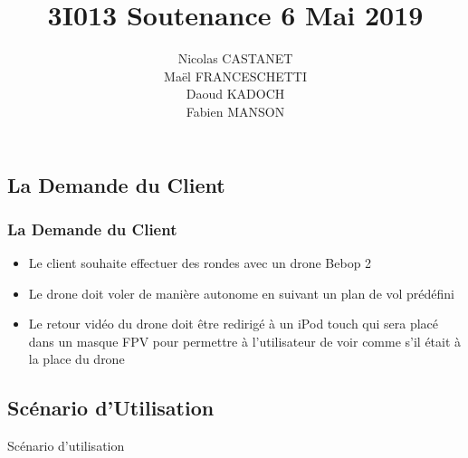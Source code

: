\documentclass{beamer}
\title{3I013 Soutenance 6 Mai 2019}
\author{Nicolas CASTANET\\ Maël FRANCESCHETTI\\Daoud KADOCH\\Fabien MANSON\\}
\begin{document}
	\begin{frame}
		\begin{center}
		\date{}
		\maketitle
		\end{center}
	\end{frame}
	

	
	
	\begin{frame}
		\section{La Demande du Client}
		\begin{center}
		\frametitle{La Demande du Client}
		\begin{itemize}
		    \item Le client souhaite effectuer des rondes avec un drone Bebop 2\\
		    \item Le drone doit voler de manière autonome en suivant un plan de vol prédéfini \\
		    \item Le retour vidéo du drone doit être redirigé à un iPod touch qui sera placé dans un masque FPV pour permettre à l'utilisateur de voir comme s'il était à la place du drone\\
		\end{itemize}
		   
		\end{center}
	\end{frame}
	\begin{frame}
		\section{Scénario d'Utilisation}
		\begin{center}
		\Large{
			\color{blue}
			
			Scénario d'utilisation
		}
		\end{center}
	\end{frame}
	
\end{document}
